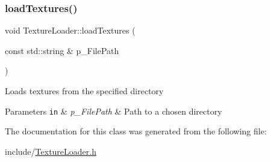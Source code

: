 \subsubsection{\texorpdfstring{load\+Textures()}{loadTextures()}}
{\footnotesize\ttfamily void Texture\+Loader\+::load\+Textures (\begin{DoxyParamCaption}\item[{const std\+::string \&}]{p\+\_\+\+File\+Path }\end{DoxyParamCaption})}

Loads textures from the specified directory 
\begin{DoxyParams}[1]{Parameters}
\mbox{\tt in}  & {\em p\+\_\+\+File\+Path} & Path to a chosen directory \\
\hline
\end{DoxyParams}


The documentation for this class was generated from the following file\+:\begin{DoxyCompactItemize}
\item 
include/\hyperlink{_texture_loader_8h}{Texture\+Loader.\+h}\end{DoxyCompactItemize}
